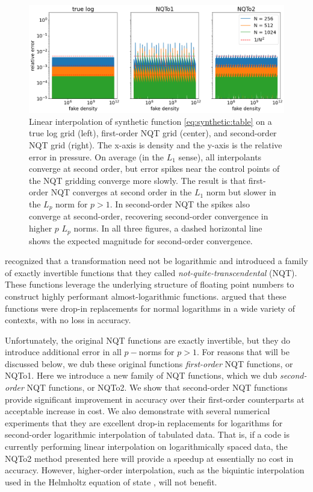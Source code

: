 \documentclass[linenumbers,twocolumn]{aastex631}
\begin{document}
\begin{nolinenumbers}
\begin{figure}[t]
    \centering
    \includegraphics[width=0.95\linewidth]{figures/nqt_convergence.png}
    \caption{Linear interpolation of synthetic function
    \eqref{eq:synthetic:table} on a true log grid (left), first-order
    NQT grid (center), and second-order NQT grid (right). The x-axis
    is density and the y-axis is the relative error in pressure. On average
    (in the $L_1$ sense), all interpolants converge at second order,
    but error spikes near the control points of the NQT gridding
    converge more slowly. The result is that first-order NQT converges
    at second order in the $L_1$ norm but slower in the $L_p$ norm for
    $p>1$. In second-order NQT the spikes also converge at
    second-order, recovering second-order convergence in higher $p$
    $L_p$ norms. In all three figures, a dashed horizontal line shows
    the expected magnitude for second-order convergence.}
    \label{fig:faketable}  
\end{figure}
\end{nolinenumbers}

\citet{NQTo1} recognized that a transformation need not be logarithmic and introduced a family of exactly invertible functions that they called \textit{not-quite-transcendental} (NQT). These functions leverage the underlying structure of floating point numbers to construct highly performant almost-logarithmic functions. \citet{NQTo1} argued that these functions were drop-in replacements for normal logarithms in a wide variety of contexts, with no loss in accuracy. 

Unfortunately, the original NQT functions are exactly invertible, but they do introduce additional error in all $p-$norms for $p > 1$. For reasons that will be discussed below, we dub these original functions \textit{first-order} NQT functions, or NQTo1. Here we introduce a new family of NQT functions, which we dub \textit{second-order} NQT functions, or NQTo2. We show that second-order NQT functions provide significant improvement in accuracy over their first-order counterparts at acceptable increase in cost. We also demonstrate with several numerical experiments that they are excellent drop-in replacements for logarithms for second-order logarithmic interpolation of tabulated data. That is, if a code is currently performing linear interpolation on logarithmically spaced data, the NQTo2 method presented here will provide a speedup at essentially no cost in accuracy. However, higher-order interpolation, such as the biquintic interpolation used in the Helmholtz equation of state \citep{HelmEOS}, will not benefit.
\end{document}
